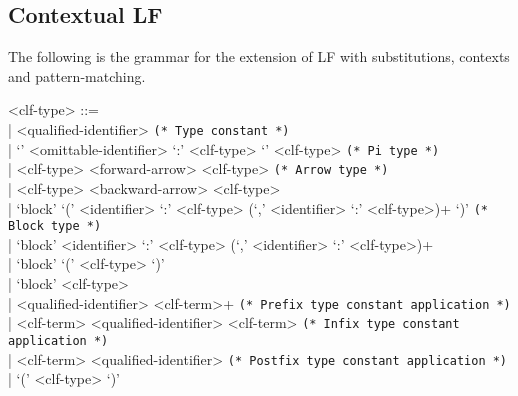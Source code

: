 \documentclass[11pt]{article}
\newcommand{\LF}{\textsc{LF}\xspace}
\begin{document}
\subsection{Contextual LF}\label{section:syntax-contextual-lf}

The following is the grammar for the extension of \LF with substitutions, contexts and pattern-matching.

\begin{grammar}
<clf-type> ::= \hfill\\
| <qualified-identifier> \hfill \texttt{(* Type constant *)}\\
| `{' <omittable-identifier> `:' <clf-type> `}' <clf-type> \hfill \texttt{(* Pi type *)}\\
| <clf-type> <forward-arrow> <clf-type> \hfill \texttt{(* Arrow type *)}\\
| <clf-type> <backward-arrow> <clf-type>\\
| `block' `(' <identifier> `:' <clf-type> (`,' <identifier> `:' <clf-type>)+ `)' \hfill \texttt{(* Block type *)}\\
| `block' <identifier> `:' <clf-type> (`,' <identifier> `:' <clf-type>)+\\
| `block' `(' <clf-type> `)'\\
| `block' <clf-type>\\
| <qualified-identifier> <clf-term>+ \hfill \texttt{(* Prefix type constant application *)}\\
| <clf-term> <qualified-identifier> <clf-term> \hfill \texttt{(* Infix type constant application *)}\\
| <clf-term> <qualified-identifier> \hfill \texttt{(* Postfix type constant application *)}\\
| `(' <clf-type> `)'


\end{grammar}
\end{document}
